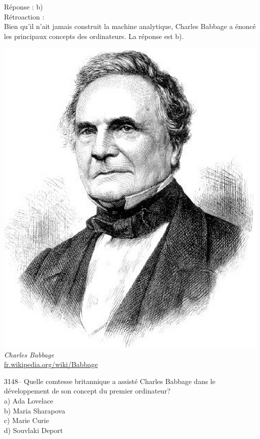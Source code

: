 \documentclass[letterpaper, 12pt]{article}
\begin{document}
R\'eponse : b)\\

R\'etroaction :\\
Bien qu'il n'ait jamais construit la machine analytique, Charles Babbage a \'enonc\'e les principaux concepts des ordinateurs. La r\'eponse est b).
\begin{center}
\includegraphics[scale=0.25]{CharlesBabbage.eps}\\
\emph{{\small Charles Babbage}}\\
\href{http://fr.wikipedia.org/wiki/Babbage}{fr.wikipedia.org/wiki/Babbage}\\[5mm]
\end{center}



3148-- Quelle comtesse britannique a assist\'e Charles Babbage dans le d\'eveloppement de son concept du premier ordinateur?\\

a) Ada Lovelace\\
b) Maria Sharapova\\
c) Marie Curie\\
d) Souvlaki Deport\\
\end{document}
